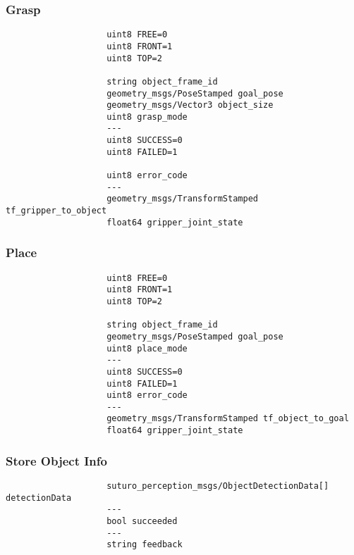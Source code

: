 \documentclass[main.tex]{subfiles}
\begin{document}
				\subsubsection{Grasp}
					\begin{lstlisting}
					uint8 FREE=0
					uint8 FRONT=1
					uint8 TOP=2
		
					string object_frame_id
					geometry_msgs/PoseStamped goal_pose 
					geometry_msgs/Vector3 object_size
					uint8 grasp_mode
					---
					uint8 SUCCESS=0
					uint8 FAILED=1
		
					uint8 error_code
					---
					geometry_msgs/TransformStamped tf_gripper_to_object
					float64 gripper_joint_state
					\end{lstlisting}
				\subsubsection{Place}
					\begin{lstlisting}
					uint8 FREE=0
					uint8 FRONT=1
					uint8 TOP=2
		
					string object_frame_id
					geometry_msgs/PoseStamped goal_pose
					uint8 place_mode
					---
					uint8 SUCCESS=0
					uint8 FAILED=1
					uint8 error_code
					---
					geometry_msgs/TransformStamped tf_object_to_goal
					float64 gripper_joint_state
					\end{lstlisting}
				\subsubsection{Store Object Info}
					\begin{lstlisting}
					suturo_perception_msgs/ObjectDetectionData[] detectionData
					---
					bool succeeded
					---
					string feedback
					\end{lstlisting}
		\endgroup
\end{document}
